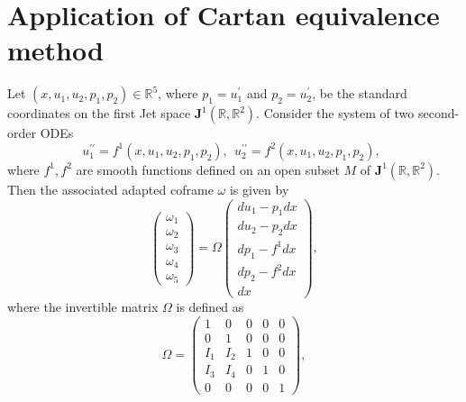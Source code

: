 \documentclass[12pt]{article}
\begin{document}
\section{Application of Cartan equivalence method}
	Let $(x,u_{1},u_{2},p_{1},p_{2})\in \mathbb{R}^{5} $, where $p_{1}=u^{\prime}_1$ and $p_{2}=u^{\prime}_2$, be the standard coordinates on the first Jet space $\textbf{J}^{1}(\mathbb{R},\mathbb{R}^{2})$. 
Consider the system of two second-order ODEs
\begin{equation}\label{NL}
u^{\prime\prime}_{1}=f^1(x,u_1,u_2,p_1,p_2),~~u^{\prime\prime}_{2}=f^2(x,u_1,u_2,p_1,p_2),~~
\end{equation}
where $f^1,f^2$ are smooth functions defined on an open subset $M$ of $\textbf{J}^{1}(\mathbb{R},\mathbb{R}^{2})$. Then the associated adapted coframe $\omega$ is given by
\begin{equation}\label{21}
\begin{pmatrix}
\omega_1\\
\omega_2\\
\omega_3\\
\omega_4\\
\omega_5
\end{pmatrix}=\Omega\begin{pmatrix}
du_1-p_1dx\\
du_2-p_2dx\\
dp_1-f^1dx\\
dp_2-f^2dx\\
dx
\end{pmatrix},
\end{equation}
where the invertible matrix $\Omega$ is defined as
\begin{equation}\label{87}
\Omega=
\begin{pmatrix}
1&0&0&0&0\\
0&1&0&0&0\\
I_1&I_2&1&0&0\\
I_3&I_4&0&1&0\\
0&0&0&0&1
\end{pmatrix},
\end{equation}
\end{document}
